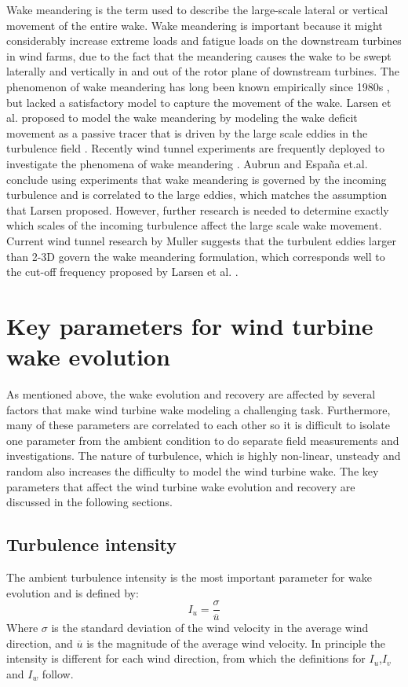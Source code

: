 \documentclass{umthesis}
\begin{document}
Wake meandering is the term used to describe the large-scale lateral or vertical movement of the entire wake. Wake meandering is important because it might considerably increase extreme loads and fatigue loads on the downstream turbines in wind farms, due to the fact that the meandering causes the wake to be swept laterally and vertically in and out of the rotor plane of downstream turbines. The phenomenon of wake meandering has long been known empirically since 1980s \cite{Ainslie_flow}\cite{Ainslie_wake}, but lacked a satisfactory model to capture the movement of the wake. Larsen et al. proposed to model the wake meandering by modeling the wake deficit movement as a passive tracer that is driven by the large scale eddies in the turbulence field \cite{Larsen_meandering}. Recently wind tunnel experiments are frequently deployed to investigate the phenomena of wake meandering \cite{Medici}. Aubrun\cite{Aubrun} and España et.al. \cite{España_Spatial}\cite{España_tunnel} conclude using experiments that wake meandering is governed by the incoming turbulence and is correlated to the large eddies, which matches the assumption that Larsen proposed. However, further research is needed to determine exactly which scales of the incoming turbulence affect the large scale wake movement. Current wind tunnel research by Muller \cite{Müller} suggests that the turbulent eddies larger than 2-3D govern the wake meandering formulation, which corresponds well to the cut-off frequency proposed by Larsen et al. \cite{Larsen_meandering}.




\section{Key parameters for wind turbine wake evolution}
As mentioned above, the wake evolution and recovery are affected by several factors that make wind turbine wake modeling a challenging task. Furthermore, many of these parameters are correlated to each other so it is difficult to isolate one parameter from the ambient condition to do separate field measurements and investigations. The nature of turbulence, which is highly non-linear, unsteady and random also increases the difficulty to model the wind turbine wake. The key parameters that affect the wind turbine wake evolution and recovery are discussed in the following sections.


\subsection{Turbulence intensity}
The ambient turbulence intensity is the most important parameter for wake evolution and is defined by:
\begin{equation}
  I_u=\frac{\sigma}{\overline{u}}
\end{equation}
Where $\sigma$ is the standard deviation of the wind velocity in the average wind direction, and $\overline{u}$ is the magnitude of the average wind velocity. In principle the intensity is different for each wind direction, from which the definitions for $I_u$,$I_v$ and $I_w$ follow.
\end{document}
